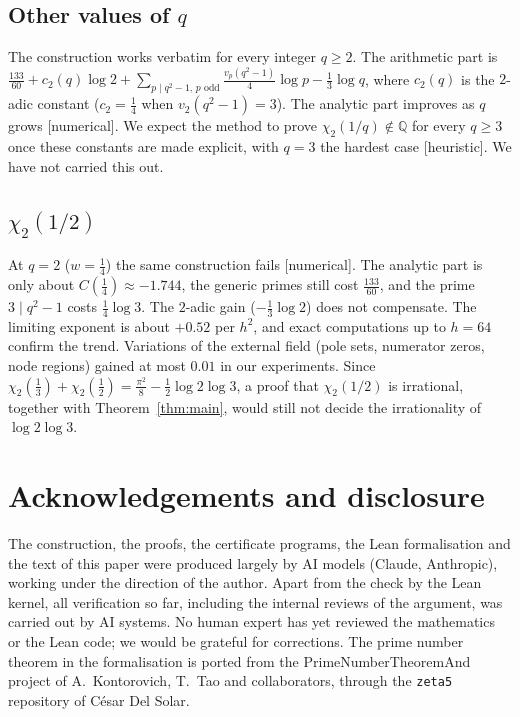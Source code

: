 \documentclass[11pt]{amsart}
\theoremstyle{definition}
\theoremstyle{remark}
\numberwithin{equation}{section}
\newcommand{\QQ}{\mathbb{Q}}
\newcommand{\lean}[1]{{\def\_{\textunderscore\allowbreak}\texttt{#1}}}
\begin{document}
\subsection{Other values of \texorpdfstring{$q$}{q}}
The construction works verbatim for every integer $q\ge2$. The arithmetic part is
$\frac{133}{60}+c_2(q)\log2+\sum_{p\mid q^2-1,\,p\text{ odd}}\frac{v_p(q^2-1)}4\log p-\frac13\log q$, where $c_2(q)$ is the
$2$-adic constant ($c_2=\frac14$ when $v_2(q^2-1)=3$). The analytic part improves as $q$ grows [numerical]. We expect the method to prove $\chi_2(1/q)\notin\QQ$ for
every $q\ge3$ once these constants are made explicit, with $q=3$ the hardest case [heuristic]. We have not carried
this out.

\subsection{\texorpdfstring{$\chi_2(1/2)$}{chi2(1/2)}}
At $q=2$ ($w=\frac14$) the same construction fails [numerical]. The analytic part is only about $C(\frac14)\approx-1.744$,
the generic primes still cost $\frac{133}{60}$, and the prime $3\mid q^2-1$ costs $\frac14\log3$. The $2$-adic gain
($-\frac13\log2$) does not compensate. The limiting exponent is about $+0.52$ per $h^2$, and exact computations up to
$h=64$ confirm the trend. Variations of the external field (pole sets, numerator zeros, node regions) gained at most
$0.01$ in our experiments. Since $\chi_2(\frac13)+\chi_2(\frac12)=\frac{\pi^2}8-\frac12\log2\log3$, a proof that
$\chi_2(1/2)$ is irrational, together with Theorem~\ref{thm:main}, would still not decide the irrationality of
$\log2\log3$.

\section*{Acknowledgements and disclosure}
The construction, the proofs, the certificate programs, the Lean formalisation and the text of this paper were produced
largely by AI models (Claude, Anthropic), working under the direction of the author. Apart from the check by the Lean
kernel, all verification so far, including the internal reviews of the argument, was carried out by AI systems. No
human expert has yet reviewed the mathematics or the Lean code; we would be grateful for corrections. The prime number
theorem in the formalisation is ported from the PrimeNumberTheoremAnd project of A.~Kontorovich, T.~Tao and
collaborators, through the \lean{zeta5} repository of C\'esar Del Solar.



\end{document}
